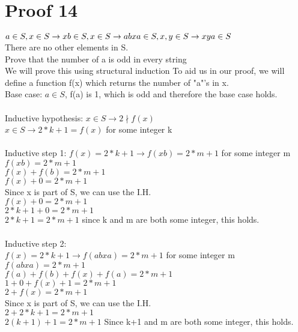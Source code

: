 \documentclass{article}
\begin{document}
\section{Proof 14}
 $a \in S, \\x \in S \rightarrow xb \in S, \\x \in S \rightarrow abxa \in S, \\x,y \in S \rightarrow xya \in S$\\
There are no other elements in S.\\
Prove that the number of a is odd in every string\\
We will prove this using structural induction
To aid us in our proof, we will define a function f(x) which returns the number of "a"'s in x.\\

Base case: $a \in S$, f(a) is 1, which is odd and therefore the base case holds.\\
\\
Inductive hypothesis:
$x \in S \rightarrow 2 \nmid f(x)$\\
$x \in S \rightarrow 2*k+1 = f(x)$ for some integer k\\
\\
Inductive step 1:
$f(x) = 2*k+1 \rightarrow f(xb) = 2*m+1$ for some integer m\\
$f(xb) = 2*m+1$\\
$f(x)+f(b) = 2*m+1$\\
$f(x)+0 = 2*m+1$\\
Since x is part of S, we can use the I.H.\\
$f(x)+0 = 2*m+1$\\
$2*k+1+0 = 2*m+1$\\
$2*k+1 = 2*m+1$ since k and m are both some integer, this holds.\\
\\
Inductive step 2:\\
$f(x) = 2*k+1 \rightarrow f(abxa) = 2*m+1$ for some integer m\\
$f(abxa) = 2*m+1$\\
$f(a) + f(b) + f(x) + f(a) = 2*m+1$\\
$1 + 0 + f(x) + 1 = 2*m+1$\\
$2+f(x) = 2*m+1$\\
Since x is part of S, we can use the I.H.\\
$2+2*k+1 = 2*m+1$\\
$2(k+1)+1 = 2*m+1$ Since k+1 and m are both some integer, this holds.\\
\\
\end{document}
